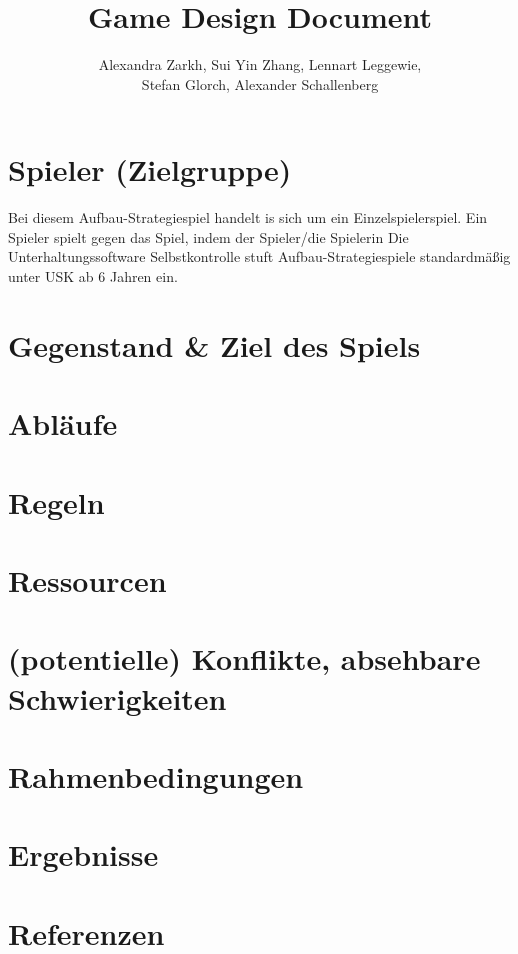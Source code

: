 \documentclass[paper=A4,pagesize=auto,12pt,headinclude=true,footinclude=true,BCOR=0mm,DIV=calc]{scrartcl}
\title{Game Design Document}
\author{Alexandra Zarkh, Sui Yin Zhang, Lennart Leggewie,\\ Stefan Glorch, Alexander Schallenberg}
\newcommand{\sectionspace}{
	\vspace{0.5cm}
}
\begin{document}
	
\begin{titlepage}
	\maketitle
\end{titlepage}


\tableofcontents
\newpage

\section{Spieler (Zielgruppe)}\label{sec:Spieler}
Bei diesem Aufbau-Strategiespiel handelt is sich um ein Einzelspielerspiel. Ein Spieler spielt gegen das Spiel, indem der Spieler/die Spielerin
Die Unterhaltungssoftware Selbstkontrolle stuft Aufbau-Strategiespiele standardmäßig unter USK ab 6 Jahren \cite{usk_6} ein.

\sectionspace
\section{Gegenstand \& Ziel des Spiels}\label{sec:Gegenstand}

\sectionspace
\section{Abläufe}\label{sec:Ablaeufe}

\sectionspace
\section{Regeln}\label{sec:Regeln}

\sectionspace
\section{Ressourcen}\label{sec:Ressourcen}

\sectionspace
\section{(potentielle) Konflikte, absehbare Schwierigkeiten}\label{sec:Konflikte}

\sectionspace
\section{Rahmenbedingungen}\label{sec:Rahmenbedingungen}

\sectionspace
\section{Ergebnisse}\label{sec:Ergebnisse}

\sectionspace
\section{Referenzen}\label{sec:Referenzen}

\newpage
\printbibliography[heading=bibnumbered]
\end{document}
